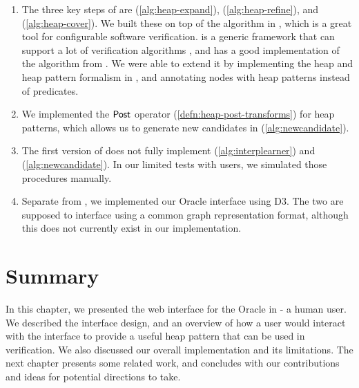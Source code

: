 \begin{enumerate}
  \item The three key steps of \verifier are \expandp (\autoref{alg:heap-expand}),  (\autoref{alg:heap-refine}), and \coverp (\autoref{alg:heap-cover}). We built these on top of the \impact algorithm in \cpachecker, which is a great tool for configurable software verification. \cpachecker is a generic framework that can support a lot of verification algorithms \cite{cpachecker}, and has a good implementation of the \impact algorithm from \cite{mcmillan06}. We were able to extend it by implementing the heap and heap pattern formalism in \cpachecker, and annotating nodes with heap patterns instead of predicates.
  \item We implemented the $\mathsf{Post}$ operator (\autoref{defn:heap-post-transforms}) for heap patterns, which allows us to generate new candidates in \newcandidate (\autoref{alg:newcandidate}).
  \item The first version of \verifier does not fully implement \seplearner (\autoref{alg:interplearner}) and \newcandidate (\autoref{alg:newcandidate}). In our limited tests with users, we simulated those procedures manually.
  \item Separate from \cpachecker, we implemented our Oracle interface using D3. The two are supposed to interface using a common graph representation format, although this does not currently exist in our implementation.
\end{enumerate}

\section*{Summary}
In this chapter, we presented the web interface for the Oracle in \verifier - a human
user. We described the interface design, and an overview of how a user would interact
with the interface to provide a useful heap pattern that can be used in verification. We
also discussed our overall implementation and its limitations. The next chapter presents
some related work, and concludes with  our contributions and ideas for potential
directions to take.

